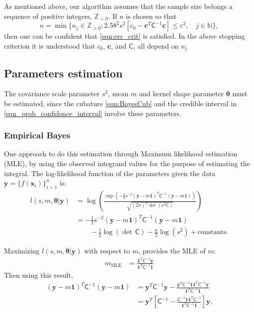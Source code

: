 \documentclass[smallextended]{svjour3}       %
\newcommand{\bm}[1]{\boldsymbol{#1}}
\newcommand{\naturals}{\mathbb{N}}
\newcommand{\posIntegers}{\mathbb{Z}_{> 0}}
\newcommand{\vtheta}{{\bm{\theta}}}
\newcommand{\vc}{\bm{c}}
\newcommand{\vx}{\bm{x}}
\newcommand{\vy}{\bm{y}}
\newcommand{\vone}{\bm{1}}
\newcommand{\mC}{\mathsf{C}}
\newcommand{\mCInv}{{\mathsf{C}^{-1}}}
\newcommand{\MLE}{\text{MLE}}
\newcommand{\errtol}{\varepsilon}
\newenvironment{nalign}{
    \begin{equation}
    \begin{aligned}
}{
    \end{aligned}
    \end{equation}
    \ignorespacesafterend
}
\begin{document}
As mentioned above, our algorithm assumes that the sample size belongs a sequence of positive integers, $\posIntegers$.  If $n$ is chosen so that 
\begin{equation} \label{FJH:eq:stopcritA}
n = \min\{n_j \in \posIntegers: 2.58^2s ^2 [c_0  -\vc ^T \mC^{-1} \vc] \le \errtol^2, \quad j \in \naturals \} ,
\end{equation}
then one can be confident that \eqref{eqn:err_crit} is satisfied.  In the above stopping criterion it is understood that $c_0$, $\vc$, and $\mC$, all depend on $n_j$











\subsection{Parameters estimation}
The covariance scale parameter $s^2$, mean $m$ and kernel shape parameter $\vtheta$ must be estimated, since the cubature \eqref{eqn:BayesCub} and the credible interval in \eqref{eqn_prob_confidence_interval} involve these parameters.

\subsubsection{Empirical Bayes}
One approach to do this estimation through Maximum likelihood estimation (MLE), by using the observed integrand values for the purpose of estimating the integral.  The log-likelihood function of the parameters given the data $\vy = \{f(\vx_i)\}_{i=1}^n$ is:
\begin{nalign}
l(s,m,\vtheta | \vy) &= \log 
\left(
\frac{
\exp\left( -\frac{1}{2} s^{-2} (\vy-m\vone)^T\mCInv(\vy-m\vone)\right) }
{\sqrt{(2\pi)^n \det(s^2\mC)}}
\right) 
\\
&= -\frac{1}{2} s^{-2} (\vy-m\vone)^T\mCInv(\vy-m\vone) 
\\
& \qquad - \frac{1}{2} \log(\det\, \mC) - \frac{n}{2} \log(s^2) + \text{constants.}
\end{nalign}

Maximizing $l(s,m,\vtheta | \vy)$ with respect to $m$, provides the MLE of $m$:
\begin{align}
\label{eqn_m_MLE}
m_\MLE &= \frac{\vone^T \mCInv \vy }{ \vone^T \mCInv \vone}
\end{align}
Then using this result, 
\begin{align*}
(\vy-m\vone)^T\mCInv(\vy-m\vone) 
& = 
\vy^T\mCInv\vy - \frac{\vy^T \mCInv \vone \vone^T \mCInv \vy}{\vone^T\mCInv \vone}
\\
& = \vy^T 
\left[ 
\mCInv - 
\frac{ \mCInv \vone \vone^T \mCInv }{\vone^T\mCInv \vone}
\right] \vy.
\end{align*}
\end{document}
